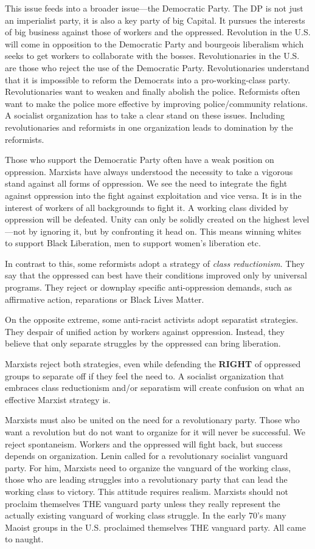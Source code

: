 This issue feeds into a broader issue---the Democratic Party. The DP is not just an imperialist party, it is also a key party of big Capital. It pursues the interests of big business against those of workers and the oppressed. Revolution in the U.S. will come in opposition to the Democratic Party and bourgeois liberalism which seeks to get workers to collaborate with the bosses. Revolutionaries in the U.S. are those who reject the use of the Democratic Party. Revolutionaries understand that it is impossible to reform the Democrats into a pro-working-class party. Revolutionaries want to weaken and finally abolish the police. Reformists often want to make the police more effective by improving police/community relations. A socialist organization has to take a clear stand on these issues. Including revolutionaries and reformists in one organization leads to domination by the reformists.

Those who support the Democratic Party often have a weak position on oppression. Marxists have always understood the necessity to take a vigorous stand against all forms of oppression. We see the need to integrate the fight against oppression into the fight against exploitation and vice versa. It is in the interest of workers of all backgrounds to fight it. A working class divided by oppression will be defeated. Unity can only be solidly created on the highest level---not by ignoring it, but by confronting it head on. This means winning whites to support Black Liberation, men to support women's liberation etc.

In contrast to this, some reformists adopt a strategy of \emph{class reductionism}. They say that the oppressed can best have their conditions improved only by universal programs. They reject or downplay specific anti-oppression demands, such as affirmative action, reparations or Black Lives Matter.

On the opposite extreme, some anti-racist activists adopt separatist strategies. They despair of unified action by workers against oppression. Instead, they believe that only separate struggles by the oppressed can bring liberation.

Marxists reject both strategies, even while defending the \textbf{RIGHT} of oppressed groups to separate off if they feel the need to. A socialist organization that embraces class reductionism and/or separatism will create confusion on what an effective Marxist strategy is.

Marxists must also be united on the need for a revolutionary party. Those who want a revolution but do not want to organize for it will never be successful. We reject spontaneism. Workers and the oppressed will fight back, but success depends on organization. Lenin called for a revolutionary socialist vanguard party. For him, Marxists need to organize the vanguard of the working class, those who are leading struggles into a revolutionary party that can lead the working class to victory. This attitude requires realism. Marxists should not proclaim themselves THE vanguard party unless they really represent the actually existing vanguard of working class struggle. In the early 70's many Maoist groups in the U.S. proclaimed themselves THE vanguard party. All came to naught.

